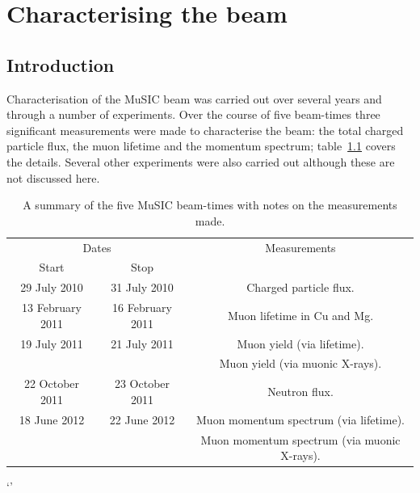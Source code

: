 \part{Characterising the beam} %
\label{prt:characterising_the_beam}
\chapter{Introduction} %
\label{sec:measurements_introduction}

Characterisation of the MuSIC beam was carried out over several years and through a number of experiments. Over the course of five beam-times three significant measurements were made to characterise the beam: the total charged particle flux, the muon lifetime and the momentum spectrum; table~\ref{tab:summary_music_beam_time} covers the details. Several other experiments were also carried out although these are not discussed here.
\begin{table}[htpb]
  \begin{center}
  \begin{tabular}{c|c|c}
    \multicolumn{2}{c|}{Dates}          & Measurements                                \\
    Start            & Stop             &                                             \\
    \hline                                                                             
    29 July 2010     & 31 July 2010     & Charged particle flux.                      \\
    13 February 2011 & 16 February 2011 & Muon lifetime in Cu and Mg.                 \\
    19 July 2011     & 21 July 2011     & Muon yield (via lifetime).                  \\
                     &                  & Muon yield (via muonic X-rays).             \\
    22 October 2011  & 23 October 2011  & Neutron flux.                               \\
    18 June 2012     & 22 June 2012     & Muon momentum spectrum (via lifetime).      \\
                     &                  & Muon momentum spectrum (via muonic X-rays). \\
  \end{tabular}
  \end{center}
  \caption{A summary of the five MuSIC beam-times with notes on the measurements made.}
  \label{tab:summary_music_beam_time}
\end{table}
`'
